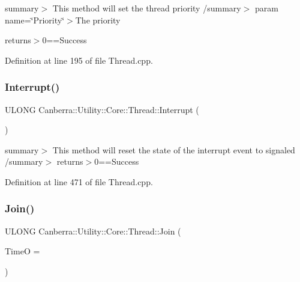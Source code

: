 summary$>$ This method will set the thread priority /summary$>$ param name=\char`\"{}\+Priority\char`\"{}$>$The priority

returns$>$0==Success

Definition at line 195 of file Thread.\+cpp.

\mbox{\label{class_canberra_1_1_utility_1_1_core_1_1_thread_a1fd94cc284af89a82282d506e5529d22_a1fd94cc284af89a82282d506e5529d22}} 
\subsubsection{\texorpdfstring{Interrupt()}{Interrupt()}}
{\footnotesize\ttfamily U\+L\+O\+NG Canberra\+::\+Utility\+::\+Core\+::\+Thread\+::\+Interrupt (\begin{DoxyParamCaption}{ }\end{DoxyParamCaption})\hspace{0.3cm}{\ttfamily [virtual]}}

summary$>$ This method will reset the state of the interrupt event to signaled /summary$>$ returns$>$0==Success

Definition at line 471 of file Thread.\+cpp.

\mbox{\label{class_canberra_1_1_utility_1_1_core_1_1_thread_a6ecc7af6e51f7fa5d45db0f05dd76435_a6ecc7af6e51f7fa5d45db0f05dd76435}} 
\subsubsection{\texorpdfstring{Join()}{Join()}}
{\footnotesize\ttfamily U\+L\+O\+NG Canberra\+::\+Utility\+::\+Core\+::\+Thread\+::\+Join (\begin{DoxyParamCaption}\item[{L\+O\+NG}]{TimeO = {} }\end{DoxyParamCaption})\hspace{0.3cm}{\ttfamily [virtual]}}


